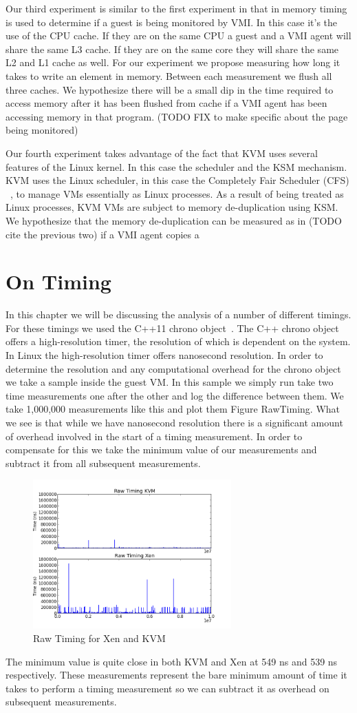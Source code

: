 Our third experiment is similar to the first experiment in that in memory timing is used to determine if a guest is being monitored by VMI. In this case it's the use of the CPU cache. If they are on the same CPU a guest and a VMI agent will share the same L3 cache. If they are on the same core they will share the same L2 and L1 cache as well. For our experiment we propose measuring how long it takes to write an element in memory. Between each measurement we flush all three caches. We hypothesize there will be a small dip in the time required to access memory after it has been flushed from cache if a VMI agent has been accessing memory in that program. (TODO FIX to make specific about the page being monitored) 


Our fourth experiment takes advantage of the fact that KVM uses several features of the Linux kernel. In this case the scheduler and the KSM mechanism. KVM uses the Linux scheduler, in this case the Completely Fair Scheduler (CFS) ~\cite{pabla_completely_2009}, to manage VMs essentially as Linux processes. As a result of being treated as Linux processes, KVM VMs are subject to memory de-duplication using KSM. We hypothesize that the memory de-duplication can be measured as in (TODO cite the previous two) if a VMI agent copies a 

\section{On Timing}

In this chapter we will be discussing the analysis of a number of different timings. For these timings we used the C++11 chrono object~\cite{_chrono_2014}. The C++ chrono object offers a high-resolution timer, the resolution of which is dependent on the system. In Linux the high-resolution timer offers nanosecond resolution.  In order to determine the resolution and any computational overhead for the chrono object we take a sample inside the guest VM. In this sample we simply run take two time measurements one after the other and log the difference between them. We take 1,000,000 measurements like this and plot them Figure RawTiming. What we see is that while we have nanosecond resolution there is a significant amount of overhead involved in the start of a timing measurement. In order to compensate for this we take the minimum value of our measurements and subtract it from all subsequent measurements. 

\begin{figure}\label{RawTiming}
	  \centering
	  \includegraphics[width=3in]{figures/RawTimingXenandKVM.png}
	  \caption{Raw Timing for Xen and KVM}
\end{figure}


The minimum value is quite close in both KVM and Xen at 549 ns and 539 ns respectively. These measurements represent the bare minimum amount of time it takes to perform a timing measurement so we can subtract it as overhead on subsequent measurements.  